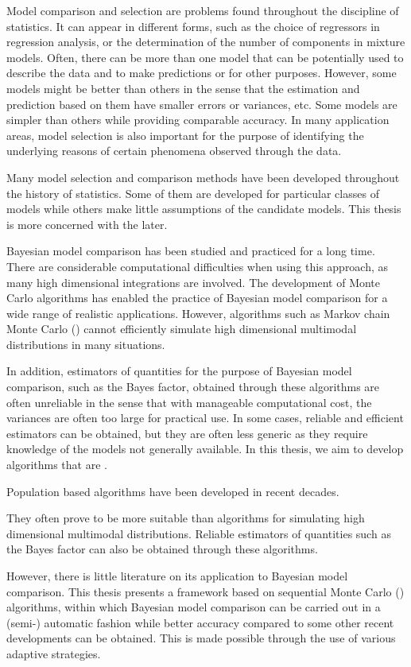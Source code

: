 Model comparison and selection are problems found throughout the discipline of statistics. It can appear in different forms, such as the choice of regressors in regression analysis, or the determination of the number of components in mixture models. Often, there can be more than one model that can be potentially used to describe the data and to make predictions or for other purposes. However, some models might be better than others in the sense that the estimation and prediction based on them have smaller errors or variances, etc. Some models are simpler than others while providing comparable accuracy. In many application areas, model selection is also important for the purpose of identifying the underlying reasons of certain phenomena observed through the data.
\begin{draftpar}
Many model selection and comparison methods have been developed throughout the history of statistics. Some of them are developed for particular classes of models while others make little assumptions of the candidate models. This thesis is more concerned with the later.
\end{draftpar}

Bayesian model comparison has been studied and practiced for a long time. There are considerable computational difficulties when using this approach, as many high dimensional integrations are involved. The development of Monte Carlo algorithms has enabled the practice of Bayesian model comparison for a wide range of realistic applications. However, algorithms such as Markov chain Monte Carlo (\mcmc) cannot efficiently simulate high dimensional multimodal distributions in many situations.
\begin{draftpar}
In addition, estimators of quantities for the purpose of Bayesian model comparison, such as the Bayes factor, obtained through these algorithms are often unreliable in the sense that with manageable computational cost, the variances are often too large for practical use. In some cases, reliable and efficient estimators can be obtained, but they are often less generic as they require knowledge of the models not generally available. In this thesis, we aim to develop  algorithms that are .
\end{draftpar}

Population based algorithms have been developed in recent decades.
\begin{draftpar}
They often prove to be more suitable than \mcmc algorithms for simulating high dimensional multimodal distributions. Reliable estimators of quantities such as the Bayes factor can also be obtained through these algorithms.
\end{draftpar}
However, there is little literature on its application to Bayesian model comparison. This thesis presents a framework based on sequential Monte Carlo (\smc) algorithms, within which Bayesian model comparison can be carried out in a (semi-) automatic fashion while better accuracy compared to some other recent developments can be obtained. This is made possible through the use of various adaptive strategies.

